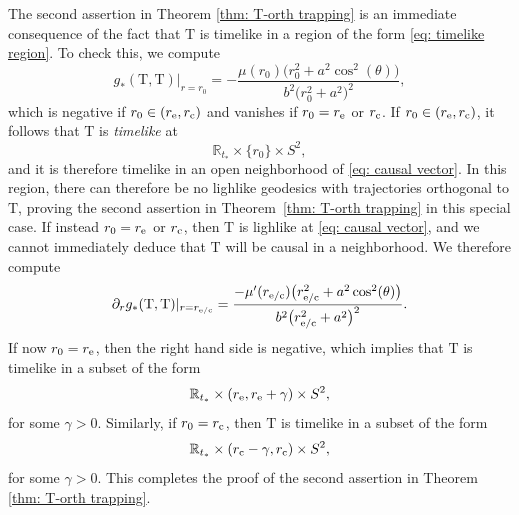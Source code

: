 \documentclass[10pt,a4paper]{amsart}
\renewcommand{\d}{\partial}
\newcommand{\T}{\mathrm T}
\newcommand{\R}[0]{\mathbb{R}}
\numberwithin{equation}{section}
\begin{document}
\begin{Remark} \label{rmk: second assertion}
The second assertion in Theorem \ref{thm: T-orth trapping} is an immediate consequence of the fact that $\T$ is timelike in a region of the form \eqref{eq: timelike region}.
To check this, we compute
\[ %
	g_*(\T,\T)|_{r = r_0}
		= - \frac{\mu(r_0)\big(r_0^2 + a^2 \cos^2(\theta)\big)}{b^2\big(r_0^2 + a^2\big)^2},
\]
which is negative if $r_0 \in (r_{\rm e}, r_{\rm c})$ and vanishes if $r_0 = r_{\rm e}$ or $r_{\rm c}$.
If $r_0 \in (r_{\rm e}, r_{\rm c})$, it follows that $\T$ is \emph{timelike} at
\begin{equation} \label{eq: causal vector}
	\R_{t_*} \times \{r_0\} \times S^2,
\end{equation}
and it is therefore timelike in an open neighborhood of \eqref{eq: causal vector}.
In this region, there can therefore be no lighlike geodesics with trajectories orthogonal to $\T$, proving the second assertion in Theorem~\ref{thm: T-orth trapping} in this special case.
If instead $r_0 = r_{\rm e}$ or $r_{\rm c}$, then $\T$ is lighlike at \eqref{eq: causal vector}, and we cannot immediately deduce that $\T$ will be causal in a neighborhood.
We therefore compute
\begin{align*}
	\d_r g_*(\T, \T)|_{r = r_{\rm e/c}}
		= \frac{-\mu'(r_{\rm e/c}) \big(r_{\rm e/c}^2 + a^2\cos^2(\theta)\big)}{b^2 \big(r_{\rm e/c}^2 + a^2\big)^2}.
\end{align*}
If now $r_0 = r_{\rm e}$, then the right hand side is negative, which implies that $\T$ is timelike in a subset of the form
\[
	\R_{t_*} \times (r_{\rm e}, r_{\rm e} + \gamma) \times S^2,
\]
for some $\gamma > 0$.
Similarly, if $r_0 = r_{\rm c}$, then $\T$ is timelike in a subset of the form
\[
	\R_{t_*} \times (r_{\rm c} - \gamma, r_{\rm c}) \times S^2,
\]
for some $\gamma > 0$.
This completes the proof of the second assertion in Theorem \ref{thm: T-orth trapping}.
\end{Remark}
\end{document}
